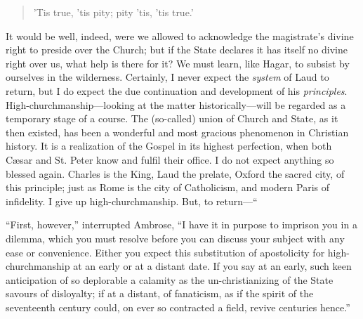 \begin{quote}

'Tis true, 'tis pity; pity 'tis, 'tis true.'

\end{quote}

It would be well, indeed, were we allowed to
acknowledge the magistrate's divine right to preside over the Church;
but if the State declares it has itself no divine right over us, what
help is there for it? We must learn, like Hagar, to subsist by
ourselves in the wilderness. Certainly, I never expect the \emph{system}
of Laud to return, but I do expect the due continuation and
development of his \emph{principles}. High-churchmanship—looking at
the matter historically—will be regarded as a temporary stage
of a course. The (so-called) union of Church and State, as it then
existed, has been a wonderful and most gracious phenomenon in
Christian history. It is a realization of the Gospel in its highest
perfection, when both Cæsar and St. Peter know and fulfil their
office. I do not expect anything so blessed again. Charles is the
King, Laud the prelate, Oxford the sacred city, of this principle;
just as Rome is the city of Catholicism, and modern Paris of
infidelity. I give up high-churchmanship. But, to return—``

``First, however,'' interrupted Ambrose, ``I have it
in purpose to imprison you in a dilemma, which you must resolve before
you can discuss your subject with any ease or convenience. Either you
expect this substitution of apostolicity for high-churchmanship at an
early or at a distant date. If you say at an early, such keen
anticipation of so deplorable a calamity as the un-christianizing of
the State savours of disloyalty; if at a distant, of fanaticism, as if
the spirit of the seventeenth century could, on ever so contracted a
field, revive centuries hence.''

